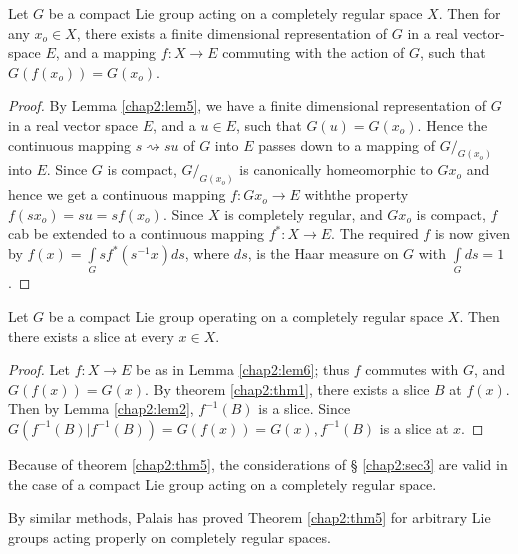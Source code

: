 \begin{lem}\label{chap2:lem6}%
  Let $G$ be a compact Lie group acting on a completely regular space
  $X$. Then for any $x_o \in X$, there exists a finite dimensional
  representation of $G$ in a real vector-space $E$, and a mapping $f: X
  \to E$ commuting with the action of $G$, such that $G (f(x_o)) =
  G(x_o)$. 
\end{lem}

\begin{proof}
  By Lemma \ref{chap2:lem5}, we have a finite dimensional representation of $G$ in a
  real vector space $E$, and a $u \in E$, such that $G(u) =
  G(x_o)$. Hence the continuous mapping $s \rightsquigarrow su $  of $G$
  into $E$ passes down to a mapping of $G/_{G(x_o)}$ into $E$. Since $G$
  is compact, $G/_{G(x_o)}$ is canonically homeomorphic to $Gx_o$ and
  hence we get a continuous mapping $f : Gx_o \to E$
  with\pageoriginale the property 
  $f (sx_o) = su = s f(x_o)$. Since $X$ is completely regular, and
  $Gx_o$ is compact, $f$ cab be extended to a continuous mapping $f^* :
  X \to E$. The required $f$ is now given by $f(x)=\int\limits_{G} s
  f^* (s^{-1} x) ds$, where $ds$, is the Haar measure on $G$ with
  $\int\limits_{G} ds = 1$. 
\end{proof}


\begin{thm}\label{chap2:thm5}%
  Let $G$ be a compact Lie group operating on a
  completely regular space $X$. Then there exists a slice at every $x
  \in X$. 
\end{thm}

\begin{proof}
  Let $f : X \to E$ be as in Lemma \ref{chap2:lem6}; thus $f$ commutes with $G$, and
  $G(f(x)) = G(x)$. By theorem \ref{chap2:thm1}, there exists a slice $B$ at $f
  (x)$. Then by Lemma \ref{chap2:lem2}, $f^{-1} (B)$ is a slice. Since $G(f^{-1} (B)
  \big| f^{-1} (B)) = G(f(x)) = G(x), f^{-1}(B)$ is a slice at $x$. 
\end{proof}

\setcounter{rem}{0}
\begin{rem}%
  Because of theorem \ref{chap2:thm5}, the considerations of \S
  \ref{chap2:sec3} are valid in the 
  case of a compact Lie group acting on a completely regular space.  
\end{rem}

\begin{rem}%
  By similar methods, Palais \cite{key1} has proved Theorem
  \ref{chap2:thm5} for arbitrary Lie groups acting properly on
  completely regular spaces.  
\end{rem}

